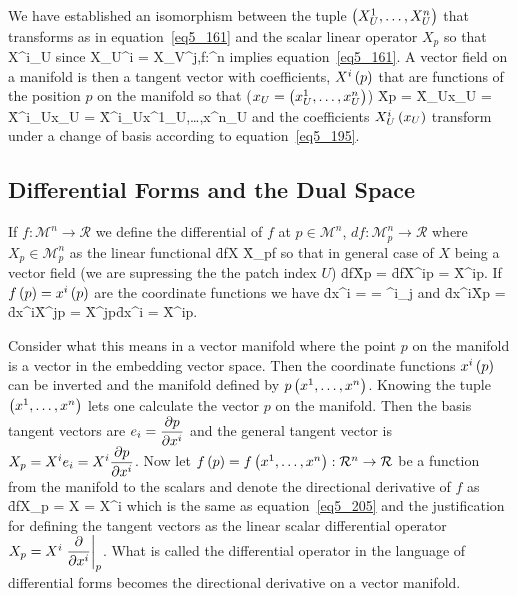 We have established an isomorphism between the tuple $\left ( {X^{1}_{U},\dots,X^{n}_{U}} \right )$ that transforms as in equation~\ref{eq5_161} and the scalar
linear operator $X_{p}$ so that
\be
	 \Leftrightarrow X^{i}_{U}
\ee
since 
\be
	X_{U}^{i} = X_{V}^{j},\:\:\forall\:f:^{n}\rightarrow{}
\ee
implies equation~\ref{eq5_161}.
A vector field on a manifold is then a tangent vector with coefficients, ${X^{i}}\left ( {p} \right )$ that are functions of the position $p$ on the manifold 
so that ($x_{U} = \left ( {x^{1}_{U},\dots,x^{n}_{U}} \right )$) 
\be\label{eq5_205}
	\f{X}{p} = \f{X_{U}}{x_{U}} = \f{X^{i}_{U}}{x_{U}} = \f{X^{i}_{U}}{x^{1}_{U},\dots,x^{n}_{U}}
\ee
and the coefficients ${X^{i}_{U}}\left ( {x_{U}} \right )$ transform under a change of basis according to equation~\ref{eq5_195}.

\subsection{Differential Forms and the Dual Space}

If $f:\mathcal{M}^{n}\rightarrow\mathcal{R}$ we define the differential of $f$ at $p\in\mathcal{M}^{n}$, $df:\mathcal{M}^{n}_{p}\rightarrow\mathcal{R}$
where $X_{p}\in\mathcal{M}^{n}_{p}$ as the linear functional
\be
	\f{df}{X} \equiv \f{X_{p}}{f}
\ee
so that in general case of $X$ being a vector field (we are supressing the the patch index $U$)
\be
	\f{df}{\f{X}{p}} = \f{df}{\f{X^{i}}{p}} = \f{X^{i}}{p}.
\ee
If ${f}\left ( {p} \right )={x^{i}}\left ( {p} \right )$ are the coordinate functions we have
\be
	\f{dx^{i}}{} =  = \delta^{i}_{j}
\ee
and
\be
	\f{dx^{i}}{\f{X}{p}} = \f{dx^{i}}{\f{X^{j}}{p}} = \f{X^{j}}{p}\f{dx^{i}}{} = \f{X^{i}}{p}.
\ee

Consider what this means in a vector manifold where the point $p$ on the manifold is a vector in the embedding vector space.  Then the coordinate
functions ${x^{i}}\left ( {p} \right )$ can be inverted and the manifold defined by ${p}\left ( {x^{1},\dots,x^{n}} \right )$.  Knowing the tuple $\left ( {x^{1},\dots,x^{n}} \right )$ lets
one calculate the vector $p$ on the manifold.  Then the basis tangent vectors are $e_{i} = \displaystyle\frac{\partial{p}}{\partial{x^{i}}}$ and the general tangent vector is
$X_{p}= X^{i}e_{i} = X^{i}\displaystyle\frac{\partial{p}}{\partial{x^{i}}}$.  Now let ${f}\left ( {p} \right )={f}\left ( {x^{1},\dots,x^{n}} \right ):\mathcal{R}^{n}\rightarrow\mathcal{R}$ be a function from
the manifold to the scalars and denote the directional derivative of $f$ as
\be
	\f{df}{X_{p}} = X\cdot{} = X^{i}
\ee
which is the same as equation~\ref{eq5_205} and the justification for defining the tangent vectors as the linear scalar differential operator 
$X_{p} = X^{i}\left . {\displaystyle\frac{\partial{}}{\partial{x^{i}}}} \right |_{p}$.
What is called the differential operator in the language of differential forms becomes the directional derivative on a vector manifold.

